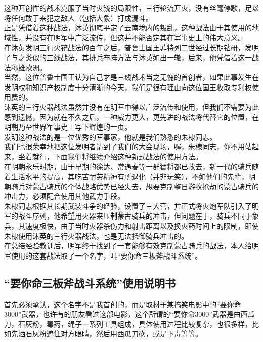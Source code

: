 \begin{multicols}{\theparacolNo}
这种开创性的战术克服了当时火铳的局限性，三行轮流开火，没有丝毫停歇，足以将任何敢于来犯之敌人（包括大象）打成漏斗。\\

正是凭借着这种战法，沐英彻底平定了云南境内的叛乱，这种战法由于其使用的地域性，并没有在明军中广泛流传，但这并不能否定其在军事史上的伟大意义。\\

在沐英发明三行火铳战法的百年之后，普鲁士国王菲特列二世经过长期钻研，发明了与之类似的三线战法，其排兵布阵方法与沐英如出一辙，后来，他凭借着这一战法称雄欧洲。\\

当然，这位普鲁士国王认为自己才是三线战术当之无愧的首创者，如果此事发生在发明权和知识产权制度十分清晰的今天，我们是很有理由向这位国王收取专利权使用费的。\\

沐英的三行火器战法虽然并没有在明军中得以广泛流传和使用，但我们不需要为此感到遗憾，因为就在不久之后，一种威力更大，更先进的战法将代替它的位置，在明朝乃至世界军事史上写下辉煌的一页。\\

发明这种战法的是一位优秀的军事家，他就是我们熟悉的朱棣同志。\\

我们也很荣幸地把这位发明者请到了我们的大会现场，喔，朱棣同志，你不用站起来，坐着就行，下面我们将继续介绍这种新式战法的使用方法。\\

在明朝永乐时期，由于早期的徐达、常遇春等一群猛将都已故去，新一代的骑兵随着生活水平的提高，其吃苦耐劳精神有所退化（并非玩笑），不如他们的先辈，明朝骑兵对蒙古骑兵的个体战略优势已经失去，想要克制整日游牧抢劫的蒙古骑兵的冲击力，必须配合使用其他武力手段。\\

朱棣同志根据其长期武装斗争的经验，设置了三大营，并正式将火炮军队引入了明军的战斗序列，他希望用火器来压制蒙古骑兵的冲击，但问题在于，骑兵不同于象兵，其速度极快，由于当时火器杀伤力和射击距离以及换火药时间上的限制，即使朱棣使用沐英的三行火器战法，也是无法抵御骑兵冲击的。\\

在总结经验教训后，明军终于找到了一套能够有效克制蒙古骑兵的战法，本人给明军使用的这套战法取了一个名字，叫“要你命三板斧战斗系统”。\\

\subsection{“要你命三板斧战斗系统”使用说明书}
首先必须承认，这个名字不是我首创的，而是取材于某搞笑电影中的“要你命3000”武器，也许有的朋友看过这部电影，这个所谓的“要你命3000”武器是由西瓜刀，石灰粉，毒药，绳子一系列工具组成，具体使用过程比较复杂，也很多样，比如先洒石灰粉遮住对方眼睛，然后用西瓜刀砍，或是下毒等等。\\


\end{multicols}
